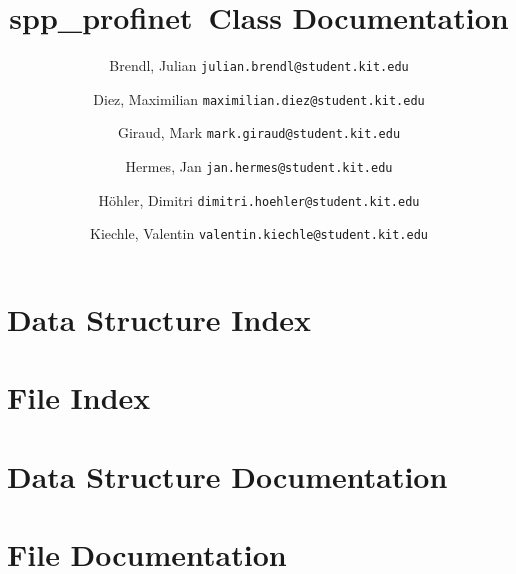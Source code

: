 \documentclass[listof=totoc,a4paper]{scrreprt}
\newcommand{\+}{\discretionary{\mbox{\scriptsize$\hookleftarrow$}}{}{}}
\newcommand{\sppname}{spp\_profinet}
\newcommand{\clearemptydoublepage}{%
  \newpage{\pagestyle{empty}\cleardoublepage}%
}
\begin{document}
\hypersetup{pageanchor=false,
             bookmarks=true,
             bookmarksnumbered=true,
             pdfencoding=unicode
            }

\begin{titlepage}
\title{\sppname \ Class Documentation}
\author{
    Brendl, Julian
    \texttt{julian.brendl@student.kit.edu}
    \and
    Diez, Maximilian
    \texttt{maximilian.diez@student.kit.edu}
    \and
    Giraud, Mark
    \texttt{mark.giraud@student.kit.edu}
    \and
    Hermes, Jan
    \texttt{jan.hermes@student.kit.edu}
    \and
    Höhler, Dimitri
    \texttt{dimitri.hoehler@student.kit.edu}
    \and
    Kiechle, Valentin
    \texttt{valentin.kiechle@student.kit.edu}
}

\titlehead{\texttt{[image: images/title.png]}}

\maketitle

\setcounter{page}{2}
\end{titlepage}

\tableofcontents
\clearemptydoublepage
{}
\hypersetup{pageanchor=true}

\chapter{Data Structure Index}

\chapter{File Index}

\chapter{Data Structure Documentation}
















\chapter{File Documentation}
















\newpage
{}
\clearemptydoublepage
{}
\printindex
\end{document}
